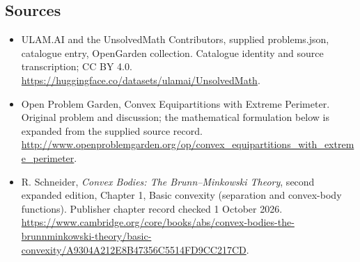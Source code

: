 \documentclass[11pt,a4paper]{article}
\begin{document}
\subsection{Sources}
\begin{itemize}
\item[S1] ULAM.AI and the UnsolvedMath Contributors, supplied problems.json, catalogue entry, OpenGarden collection. Catalogue identity and source transcription; CC BY 4.0.
\url{https://huggingface.co/datasets/ulamai/UnsolvedMath}.
\item[S2] Open Problem Garden, Convex Equipartitions with Extreme Perimeter. Original problem and discussion; the mathematical formulation below is expanded from the supplied source record.
\url{http://www.openproblemgarden.org/op/convex_equipartitions_with_extreme_perimeter}.

\item[A1] R. Schneider, \emph{Convex Bodies: The Brunn--Minkowski Theory}, second expanded edition, Chapter 1, Basic convexity (separation and convex-body functions). Publisher chapter record checked 1 October 2026. \url{https://www.cambridge.org/core/books/abs/convex-bodies-the-brunnminkowski-theory/basic-convexity/A9304A212E8B47356C5514FD9CC217CD}.
\end{itemize}
\end{document}
